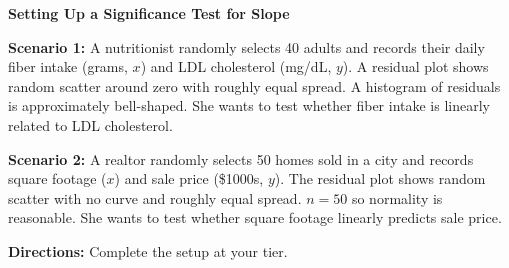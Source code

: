 \documentclass[10pt]{article}
\begin{document}
\namepartnerperiod

\vspace{0.1in}
\textbf{Setting Up a Significance Test for Slope}

\vspace{0.05in}
\textbf{Scenario 1:} A nutritionist randomly selects 40 adults and records their
daily fiber intake (grams, $x$) and LDL cholesterol (mg/dL, $y$). A residual plot
shows random scatter around zero with roughly equal spread. A histogram of residuals
is approximately bell-shaped. She wants to test whether fiber intake is linearly
related to LDL cholesterol.

\vspace{0.05in}
\textbf{Scenario 2:} A realtor randomly selects 50 homes sold in a city and records
square footage ($x$) and sale price (\$1000s, $y$). The residual plot shows random
scatter with no curve and roughly equal spread. $n = 50$ so normality is reasonable.
She wants to test whether square footage linearly predicts sale price.

\vspace{0.1in}
\textbf{Directions:} Complete the setup at your tier.
\end{document}
